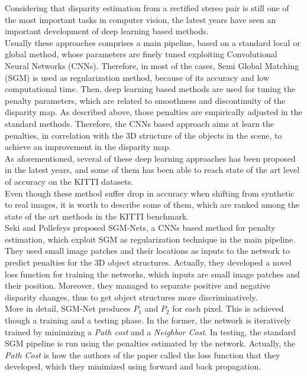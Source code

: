 Considering that disparity estimation from a rectified stereo pair is still one of the most important tasks in computer vision, the latest years have seen an important development of deep learning based methods. \\
Usually these approaches comprises a main pipeline, based on a standard local or global method, whose parameters are finely tuned exploiting Convolutional Neural Networks (CNNs). 
Therefore, in most of the cases, Semi Global Matching (SGM) is used as regularization method, because of its accuracy and low computational time. 
Then, deep learning based methods are used for tuning the penalty parameters, which are related to smoothness and discontinuity of the disparity map. 
As described above, those penalties are empirically adjusted in the standard methods. 
Therefore, the CNNs based approach aims at learn the penalties, in correlation with the 3D structure of the objects in the scene, to achieve an improvement in the disparity map. \\
As aforementioned, several of these deep learning approaches has been proposed in the latest years, and some of them has been able to reach state of the art level of accuracy on the KITTI datasets.\\
Even though these method suffer drop in accuracy when shifting from synthetic to real images, it is worth to describe some of them, which are ranked among the state of the art methods in the KITTI benchmark. \\
Seki and Pollefeys proposed SGM-Nets\cite{Seki2017}, a CNNs based method for penalty estimation, which exploit SGM as regularization technique in the main pipeline. 
They used small image patches and their locations as inputs to the network to predict penalties for the 3D object structures. 
Actually, they developed a novel loss function for training the networks, which inputs are small image patches and their position. 
Moreover, they managed to separate positive and negative disparity changes, thus to get object structures more discriminatively.\\
More in detail, SGM-Net produces $P_1$ and $P_2$ for each pixel. 
This is achieved though a training and a testing phase. 
In the former, the network is iteratively trained by minimizing a \textit{Path cost} and a \textit{Neighbor Cost}. 
In testing, the standard SGM pipeline is run using the penalties estimated by the network. 
Actually, the \textit{Path Cost} is how the authors of the paper called the loss function that they developed, which they minimized using forward and back propagation. 
